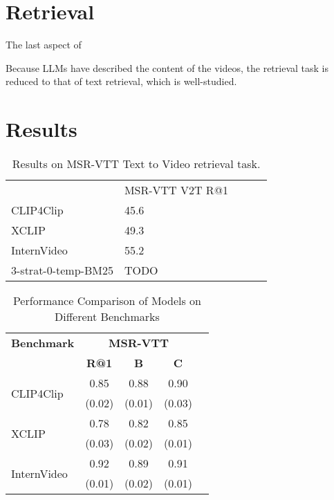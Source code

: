 \documentclass{article}
\begin{document}
\section{Retrieval}

The last aspect of 

Because LLMs have described the content of the videos, the retrieval task is reduced to that of text retrieval, which is well-studied.

\section{Results}

\begin{table}[]
\begin{tabular}{|l|l|lll}
\cline{1-2}
                    & MSR-VTT V2T R@1 &  &  &  \\ \cline{1-2}
CLIP4Clip           & 45.6            &  &  &  \\ \cline{1-2}
XCLIP               & 49.3            &  &  &  \\ \cline{1-2}
InternVideo         & 55.2            &  &  &  \\ \cline{1-2}
3-strat-0-temp-BM25 & TODO            &  &  &  \\ \cline{1-2}
\end{tabular}
\caption{Results on MSR-VTT Text to Video retrieval task.}
\end{table}

\begin{table}[htbp]
  \centering
  \begin{tabular}{lcccc}
    \toprule
    \textbf{Benchmark} & \multicolumn{3}{c}{\textbf{MSR-VTT}} \\
    \cmidrule(lr){2-4}
    & \textbf{R@1} & \textbf{B} & \textbf{C} \\
    \midrule
    \multirow{2}{*}{CLIP4Clip} & 0.85 & 0.88 & 0.90 \\
    & (0.02) & (0.01) & (0.03) \\
    \midrule
    \multirow{2}{*}{XCLIP} & 0.78 & 0.82 & 0.85 \\
    & (0.03) & (0.02) & (0.01) \\
    \midrule
    \multirow{2}{*}{InternVideo} & 0.92 & 0.89 & 0.91 \\
    & (0.01) & (0.02) & (0.01) \\
    \bottomrule
  \end{tabular}
  \label{tab:model_comparison}
  \caption{Performance Comparison of Models on Different Benchmarks}
\end{table}
\end{document}
